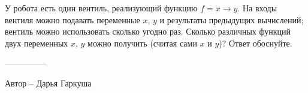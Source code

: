 \question
У робота есть один вентиль, реализующий функцию $f=x\to y$. На входы вентиля можно подавать переменные $x$, $y$ и результаты предыдущих вычислений; вентиль можно использовать сколько угодно раз. Сколько различных функций двух переменных $x$, $y$ можно получить (считая сами $x$ и $y$)? Ответ обоснуйте.

---------------

Автор -- Дарья Гаркуша